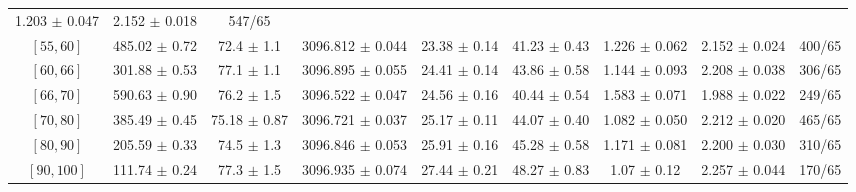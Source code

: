 \begin{tabular}{c||c|c|c|c|c|c|c||c}
1.203 $\pm$ 0.047 & 
2.152 $\pm$ 0.018 & 
547/65\\
$[55, 60]$ & 485.02 $\pm$ 0.72 & 
72.4 $\pm$ 1.1 & 
3096.812 $\pm$ 0.044 & 
23.38 $\pm$ 0.14 & 
41.23 $\pm$ 0.43 & 
1.226 $\pm$ 0.062 & 
2.152 $\pm$ 0.024 & 
400/65\\
$[60, 66]$ & 301.88 $\pm$ 0.53 & 
77.1 $\pm$ 1.1 & 
3096.895 $\pm$ 0.055 & 
24.41 $\pm$ 0.14 & 
43.86 $\pm$ 0.58 & 
1.144 $\pm$ 0.093 & 
2.208 $\pm$ 0.038 & 
306/65\\
$[66, 70]$ & 590.63 $\pm$ 0.90 & 
76.2 $\pm$ 1.5 & 
3096.522 $\pm$ 0.047 & 
24.56 $\pm$ 0.16 & 
40.44 $\pm$ 0.54 & 
1.583 $\pm$ 0.071 & 
1.988 $\pm$ 0.022 & 
249/65\\
$[70, 80]$ & 385.49 $\pm$ 0.45 & 
75.18 $\pm$ 0.87 & 
3096.721 $\pm$ 0.037 & 
25.17 $\pm$ 0.11 & 
44.07 $\pm$ 0.40 & 
1.082 $\pm$ 0.050 & 
2.212 $\pm$ 0.020 & 
465/65\\
$[80, 90]$ & 205.59 $\pm$ 0.33 & 
74.5 $\pm$ 1.3 & 
3096.846 $\pm$ 0.053 & 
25.91 $\pm$ 0.16 & 
45.28 $\pm$ 0.58 & 
1.171 $\pm$ 0.081 & 
2.200 $\pm$ 0.030 & 
310/65\\
$[90, 100]$ & 111.74 $\pm$ 0.24 & 
77.3 $\pm$ 1.5 & 
3096.935 $\pm$ 0.074 & 
27.44 $\pm$ 0.21 & 
48.27 $\pm$ 0.83 & 
1.07 $\pm$ 0.12 & 
2.257 $\pm$ 0.044 & 
170/65\\
\end{tabular}
